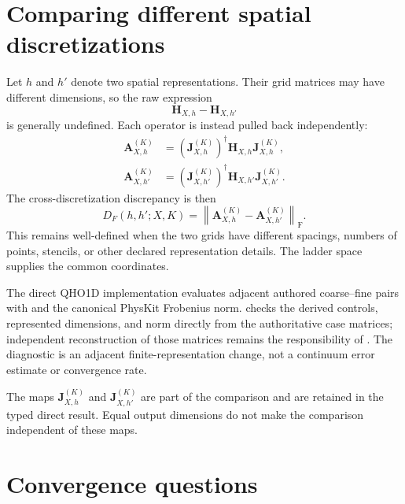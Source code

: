 \section{Comparing different spatial discretizations}


Let $h$ and $h'$ denote two spatial representations. Their grid matrices may
have different dimensions, so the raw expression
\begin{equation}
    \mathbf H_{X,h}-\mathbf H_{X,h'}
\end{equation}
is generally undefined. Each operator is instead pulled back independently:
\begin{align}
    \mathbf A_{X,h}^{(K)}
    &=
    \left(\mathbf J_{X,h}^{(K)}\right)^\dagger
    \mathbf H_{X,h}
    \mathbf J_{X,h}^{(K)},
    \\
    \mathbf A_{X,h'}^{(K)}
    &=
    \left(\mathbf J_{X,h'}^{(K)}\right)^\dagger
    \mathbf H_{X,h'}
    \mathbf J_{X,h'}^{(K)}.
\end{align}
The cross-discretization discrepancy is then
\begin{equation}
    D_F(h,h';X,K)
    =
    \left\lVert
        \mathbf A_{X,h}^{(K)}
        -
        \mathbf A_{X,h'}^{(K)}
    \right\rVert_{\mathrm F}.
\end{equation}
This remains well-defined when the two grids have different spacings, numbers
of points, stencils, or other declared representation details. The ladder
space supplies the common coordinates.

The direct QHO1D implementation evaluates adjacent authored coarse--fine pairs with
 and the canonical PhysKit Frobenius norm.
 checks the derived controls, represented dimensions,
and norm directly from the authoritative case matrices; independent reconstruction of
those matrices remains the responsibility of . The diagnostic
is an adjacent finite-representation change, not a continuum error estimate or
convergence rate.

The maps $\mathbf J_{X,h}^{(K)}$ and $\mathbf J_{X,h'}^{(K)}$ are part of the
comparison and are retained in the typed direct result. Equal output dimensions do not
make the comparison independent of these maps.

\section{Convergence questions}

